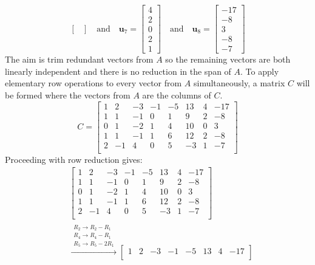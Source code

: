 \documentclass{article}
\begin{document}
\begin{itemize}
\[\begin{bmatrix}
\end{bmatrix} \quad\text{and}\quad \mathbf{u}_7 = \begin{bmatrix} 
4 \\ 2 \\ 0 \\ 2 \\ 1  
\end{bmatrix} \quad\text{and}\quad \mathbf{u}_8 = \begin{bmatrix} 
-17 \\ -8 \\ 3 \\ -8 \\ -7  
\end{bmatrix}\] 
The aim is trim redundant vectors from \(A\) so the remaining vectors are both linearly independent and there is no reduction in the span of \(A\). To apply elementary row operations to every vector from \(A\) simultaneously, a matrix \(C\) will be formed where the vectors from \(A\) are the columns of \(C\).
\[C = \begin{bmatrix}
1 &  2 & -3 & -1 & -5 &  13 & 4 & -17 \\
1 &  1 & -1 &  0 &  1 &    9 &  2 &   -8 \\
0 &  1 & -2 &  1 &  4 &  10 &  0 &    3 \\
1 &  1 & -1 &  1 &  6 &  12 &  2 &   -8 \\ 
2 & -1 &  4 &  0 &  5 &  -3 &  1 &   -7 \\ 
\end{bmatrix}\]
Proceeding with row reduction gives:
\begin{align*}
& \begin{bmatrix}
1 &  2 & -3 & -1 & -5 &  13 & 4 & -17 \\
1 &  1 & -1 &  0 &  1 &    9 &  2 &   -8 \\
0 &  1 & -2 &  1 &  4 &  10 &  0 &    3 \\
1 &  1 & -1 &  1 &  6 &  12 &  2 &   -8 \\ 
2 & -1 &  4 &  0 &  5 &  -3 &  1 &   -7 \\ 
\end{bmatrix} \\
& \xrightarrow{\begin{array}{c} R_2 \rightarrow R_2 - R_1 \\ R_4 \rightarrow R_4 - R_1 \\ R_5 \rightarrow R_5 - 2R_1 \end{array}} \begin{bmatrix}
1 &  2 &  -3 & -1 &  -5 &  13 &  4 & -17 \\

\end{bmatrix}
\end{align*}
\end{itemize}
\end{document}
